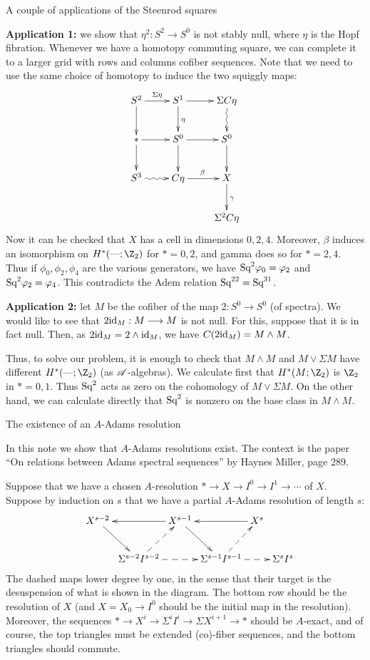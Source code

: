 \documentclass[11pt]{article}
\newcommand{\myheading}[1]
{{\noindent\Large #1}

}
\begin{document}
\myheading{A couple of applications of the Steenrod squares}
\textbf{Application 1:} we show that $\eta^2:S^2\to S^0$ is not stably null, where $\eta$ is the
Hopf fibration. Whenever we have a homotopy commuting square, we can complete it
to a larger grid with rows and columns cofiber sequences. Note that we need to
use the same choice of homotopy to induce the two squiggly maps:
\[\xymatrix{
S^2\ar[r]^{\Sigma\eta}\ar[d]&S^1\ar[r]\ar[d]^\eta&\Sigma C\eta\ar@{~>}[d]\\
\text{$*$}\ar[r]\ar[d]&S^0\ar[r]\ar[d]&S^0\ar[d]\\
S^3\ar@{~>}[r]&C\eta\ar[r]^\beta&X\ar[d]^\gamma\\
&&\Sigma^2C\eta
}\]
Now it can be checked that $X$ has a cell in dimensions $0,2,4$. Moreover,
$\beta$ induces an isomorphism on $H^*(\DASH;\Z_2)$ for $*=0,2$, and gamma does
so for $*=2,4$. Thus if $\phi_0,\phi_2,\phi_4$ are the various generators, we
have $\textup{Sq}^2\varphi_0=\varphi_2$ and $\textup{Sq}^2\varphi_2=\varphi_4$. This contradicts the Adem
relation $\textup{Sq}^{22}=\textup{Sq}^{31}$.

\textbf{Application 2:}  let $M$ be the cofiber of the map $2:S^0\to S^0$ (of
spectra). We would like to see that $2\textup{id}_M:M\longrightarrow M$ is not null. For this,
suppose that it is in fact null. Then, as $2\textup{id}_M=2\wedge\textup{id}_M$, we have
$C(2\textup{id}_M)=M\wedge M$.

Thus, to solve our problem, it is enough to check that $M\wedge M$ and $M\vee
\Sigma M$ have different $H^*(\DASH;\Z_2)$ (as $\mathscr{A}$-algebras). We calculate
first that $H^*(M;\Z_2)$ is $\Z_2$ in $*=0,1$. Thus $\textup{Sq}^2$ acts as zero on the
cohomology of $M\vee \Sigma M$. On the other hand, we can calculate directly
that $\textup{Sq}^2$ is nonzero on the base class in $M\wedge M$.

\pagebreak

\myheading{The existence of an $A$-Adams resolution}
In this note we show that $A$-Adams resolutions exist. The context is the paper
``On relations between Adams spectral sequences'' by Haynes Miller, page 289.

Suppose that we have a chosen $A$-resolution $*\to X\to I^0\to I^1\to\cdots$ of
$X$. Suppose by induction on $s$ that we have a partial $A$-Adams resolution of
length $s$:
\[\xymatrix@C=.1cm{
&X^{s-2}\ar[dr]&&X^{s-1}\ar[dr]\ar[ll]&&X^s\ar[ll]\\
&&\Sigma^{s-2}I^{s-2}\ar@{-->}[rr]\ar@{-->}[ur]
&&\Sigma^{s-1}I^{s-1}\ar@{-->}[rr]\ar@{-->}[ur]&&\Sigma^{s}I^{s}
}\]
The dashed maps lower degree by one, in the sense that their target is the
desuspension of what is shown in the diagram. The bottom row should be the
resolution of $X$ (and $X=X_0\to I^0$ should be the initial map in the
resolution). Moreover, the sequences $*\to X^i\to\Sigma^iI^i\to\Sigma
X^{i+1}\to*$ should be $A$-exact, and of course, the top triangles must be
extended (co)-fiber sequences, and the bottom triangles should commute.
\end{document}
